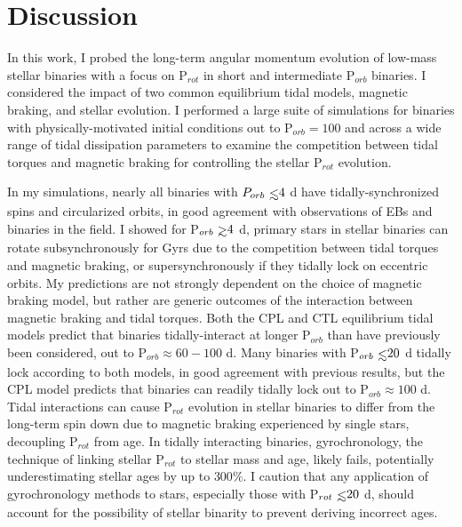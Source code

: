
\section{Discussion} \label{sync:sec:discussion}

In this work, I probed the long-term angular momentum evolution of low-mass stellar binaries with a focus on P$_{rot}$ in short and intermediate P$_{orb}$ binaries.  I considered the impact of two common equilibrium tidal models, magnetic braking, and stellar evolution.  I performed a large suite of simulations for binaries with physically-motivated initial conditions out to P$_{orb} = 100$ and across a wide range of tidal dissipation parameters to examine the competition between tidal torques and magnetic braking for controlling the stellar P$_{rot}$ evolution. 

In my simulations, nearly all binaries with $P_{orb} \lsim 4$ d have tidally-synchronized spins and circularized orbits, in good agreement with observations of \kepler EBs and binaries in the field. I showed for P$_{orb} \gsim 4$ d, primary stars in stellar binaries can rotate subsynchronously for Gyrs due to the competition between tidal torques and magnetic braking, or supersynchronously if they tidally lock on eccentric orbits. My predictions are not strongly dependent on the choice of magnetic braking model, but rather are generic outcomes of the interaction between magnetic braking and tidal torques.  Both the CPL and CTL equilibrium tidal models predict that binaries tidally-interact at longer P$_{orb}$ than have previously been considered, out to P$_{orb} \approx 60-100$ d. Many binaries with P$_{orb} \lsim 20$ d tidally lock according to both models, in good agreement with previous results, but the CPL model predicts that binaries can readily tidally lock out to P$_{orb} \approx 100$ d. Tidal interactions can cause P$_{rot}$ evolution in stellar binaries to differ from the long-term spin down due to magnetic braking experienced by single stars, decoupling P$_{rot}$ from age.  In tidally interacting binaries, gyrochronology, the technique of linking stellar P$_{rot}$ to stellar mass and age, likely fails, potentially underestimating stellar ages by up to $300\%$. I caution that any application of gyrochronology methods to stars, especially those with P$_{rot} \lsim 20$ d, should account for the possibility of stellar binarity to prevent deriving incorrect ages. 

